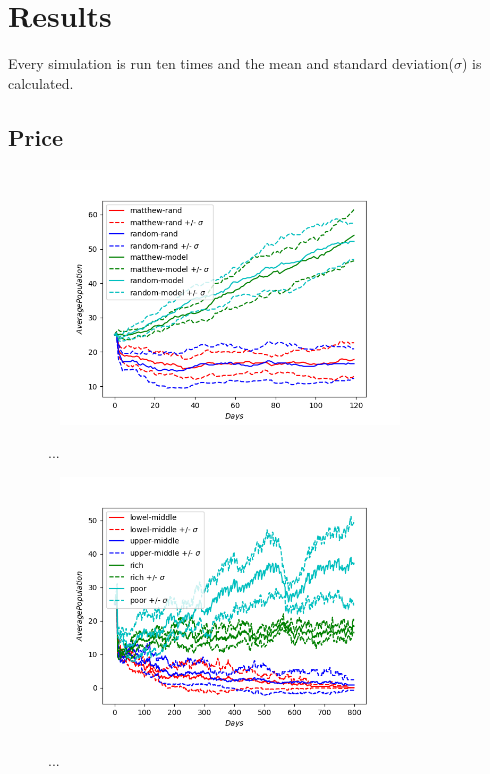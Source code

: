 \chapter{Results}

Every simulation is run ten times and the mean and standard deviation($\sigma$) is calculated. 

\section{Price}

\begin{figure}[!htb]
	\hspace*{-1cm}\ 
	\centering
	\includegraphics[width=9cm]{images/histories_deviation.png}
	\caption{ ...
	}
	\label{fig:hist_dev}
	\hspace*{2mm} 
\end{figure}

\begin{figure}[!htb]
	\hspace*{-1cm}\ 
	\centering
	\includegraphics[width=9cm]{images/histories_deviation_fund.png}
	\caption{ ...
	}
	\label{fig:alloc}
	\hspace*{2mm} 
\end{figure}


